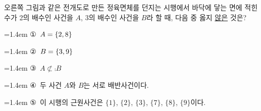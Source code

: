\noindent\begin{minipage}[t]{0.58\linewidth}\vspace{0pt}\raggedright 오른쪽 그림과 같은 전개도로 만든 정육면체를 던지는 시행에서 바닥에 닿는 면에 적힌 수가 2의 배수인 사건을 $A$, 3의 배수인 사건을 $B$라 할 때, 다음 중 옳지 \underline{않은} 것은?\end{minipage}\hfill\begin{minipage}[t]{0.4\linewidth}\vspace{0pt}\centering \resizebox{\ifdim\width>\linewidth\linewidth\else\width\fi}{!}{}\end{minipage}\par
\par\medskip\par\noindent\hangindent=1.4em {\small ①}\ $A=\{2{,}\mkern3mu\mathopen{}8\}$\par\noindent\hangindent=1.4em {\small ②}\ $B=\{3{,}\mkern3mu\mathopen{}9\}$\par\noindent\hangindent=1.4em {\small ③}\ $A\not\subset \comp{B}$\par\noindent\hangindent=1.4em {\small ④}\ 두 사건 $A$와 $B$는 서로 배반사건이다.\par\noindent\hangindent=1.4em {\small ⑤}\ 이 시행의 근원사건은 $\{1\}$, $\{2\}$, $\{3\}$, $\{7\}$, $\{8\}$, $\{9\}$이다.\par\medskip
